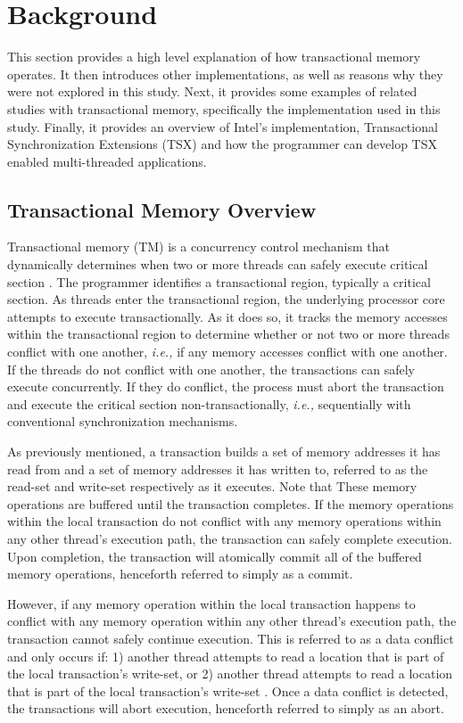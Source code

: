 \documentclass[11pt]{book}
\begin{document}
\chapter{Background}

This section provides a high level explanation of how transactional memory operates.  It
then introduces other implementations, as well as reasons why they were not explored in
this study.  Next, it provides some examples of related studies with transactional memory,
specifically the implementation used in this study.  Finally, it provides an overview of
Intel's implementation, Transactional Synchronization Extensions (TSX) and how the
programmer can develop TSX enabled multi-threaded applications.

\section{Transactional Memory Overview}

Transactional memory (TM) is a concurrency control mechanism that dynamically determines
when two or more threads can safely execute critical section \cite{sle_rajwar}.  The
programmer identifies a transactional region, typically a critical section.  As threads
enter the transactional region, the underlying processor core attempts to execute
transactionally. As it does so, it tracks the memory accesses within the transactional
region to determine whether or not two or more threads conflict with one another,
\emph{i.e.,} if any memory accesses conflict with one another.  If the threads do not
conflict with one another, the transactions can safely execute concurrently.  If they do
conflict, the process must abort the transaction and execute the critical section
non-transactionally, \emph{i.e.,} sequentially with conventional synchronization
mechanisms.

As previously mentioned, a transaction builds a set of memory addresses it has read from
and a set of memory addresses it has written to, referred to as the read-set and write-set
respectively \cite{intel_prog_ref} as it executes.  Note that These memory operations are
buffered until the transaction completes.  If the memory operations within the local
transaction do not conflict with any memory operations within any other thread's execution
path, the transaction can safely complete execution.  Upon completion, the transaction
will atomically commit all of the buffered memory operations, henceforth referred to
simply as a commit.

However, if any memory operation within the local transaction happens to conflict with any
memory operation within any other thread's execution path, the transaction cannot safely
continue execution.  This is referred to as a data conflict and only occurs if: 1) another
thread attempts to read a location that is part of the local transaction's write-set, or
2) another thread attempts to read a location that is part of the local transaction's
write-set \cite{intel_prog_ref}.  Once a data conflict is detected, the transactions will
abort execution, henceforth referred to simply as an abort.
\end{document}
